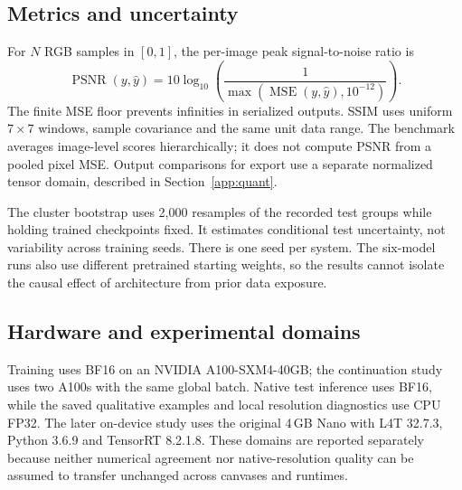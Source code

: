 \subsection{Metrics and uncertainty}
For $N$ RGB samples in $[0,1]$, the per-image peak signal-to-noise ratio is
\begin{equation}
\operatorname{PSNR}(y,\hat y)=10\log_{10}\!\left(\frac{1}{\max(\operatorname{MSE}(y,\hat y),10^{-12})}\right).
\end{equation}
The finite MSE floor prevents infinities in serialized outputs. SSIM uses
uniform $7\times7$ windows, sample covariance and the same unit data range.
The benchmark averages image-level scores hierarchically; it does not compute
PSNR from a pooled pixel MSE. Output comparisons for export use a separate
normalized tensor domain, described in Section~\ref{app:quant}.

The cluster bootstrap uses 2,000 resamples of the recorded test groups while
holding trained checkpoints fixed. It estimates conditional test uncertainty,
not variability across training seeds. There is one seed per system. The
six-model runs also use different pretrained starting weights, so the results
cannot isolate the causal effect of architecture from prior data exposure.

\subsection{Hardware and experimental domains}
Training uses BF16 on an NVIDIA A100-SXM4-40GB; the continuation study uses
two A100s with the same global batch. Native test inference uses BF16, while
the saved qualitative examples and local resolution diagnostics use CPU FP32.
The later on-device study uses the original 4\,GB Nano with L4T 32.7.3,
Python 3.6.9 and TensorRT 8.2.1.8. These domains are reported separately
because neither numerical agreement nor native-resolution quality can be
assumed to transfer unchanged across canvases and runtimes.
